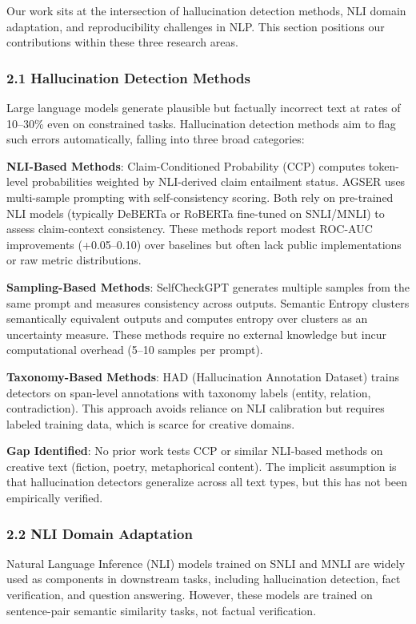 
Our work sits at the intersection of hallucination detection methods, NLI domain adaptation, and reproducibility challenges in NLP. This section positions our contributions within these three research areas.

\subsubsection{2.1 Hallucination Detection Methods}

Large language models generate plausible but factually incorrect text at rates of 10--30\% even on constrained tasks. Hallucination detection methods aim to flag such errors automatically, falling into three broad categories:

\textbf{NLI-Based Methods}: Claim-Conditioned Probability (CCP) computes token-level probabilities weighted by NLI-derived claim entailment status. AGSER uses multi-sample prompting with self-consistency scoring. Both rely on pre-trained NLI models (typically DeBERTa or RoBERTa fine-tuned on SNLI/MNLI) to assess claim-context consistency. These methods report modest ROC-AUC improvements (+0.05--0.10) over baselines but often lack public implementations or raw metric distributions.

\textbf{Sampling-Based Methods}: SelfCheckGPT generates multiple samples from the same prompt and measures consistency across outputs. Semantic Entropy clusters semantically equivalent outputs and computes entropy over clusters as an uncertainty measure. These methods require no external knowledge but incur computational overhead (5--10 samples per prompt).

\textbf{Taxonomy-Based Methods}: HAD (Hallucination Annotation Dataset) trains detectors on span-level annotations with taxonomy labels (entity, relation, contradiction). This approach avoids reliance on NLI calibration but requires labeled training data, which is scarce for creative domains.

\textbf{Gap Identified}: No prior work tests CCP or similar NLI-based methods on creative text (fiction, poetry, metaphorical content). The implicit assumption is that hallucination detectors generalize across all text types, but this has not been empirically verified.

\subsubsection{2.2 NLI Domain Adaptation}

Natural Language Inference (NLI) models trained on SNLI and MNLI are widely used as components in downstream tasks, including hallucination detection, fact verification, and question answering. However, these models are trained on sentence-pair semantic similarity tasks, not factual verification.

